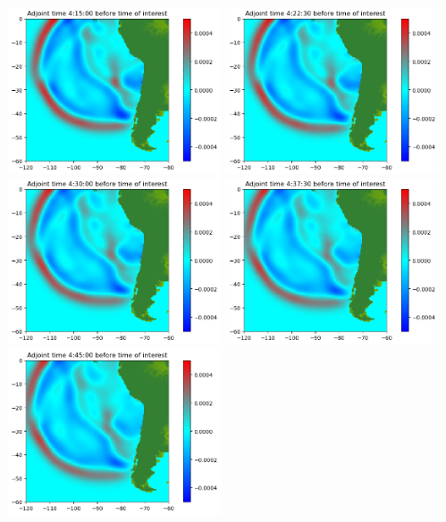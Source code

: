 \documentclass[11pt]{article}
\begin{document}
\vskip 10pt 
\includegraphics[width=0.475\textwidth]{frame0034fig0.png}
\vskip 10pt 
\includegraphics[width=0.475\textwidth]{frame0035fig0.png}
\vskip 10pt 
\includegraphics[width=0.475\textwidth]{frame0036fig0.png}
\vskip 10pt 
\includegraphics[width=0.475\textwidth]{frame0037fig0.png}
\vskip 10pt 
\includegraphics[width=0.475\textwidth]{frame0038fig0.png}
\end{document}
